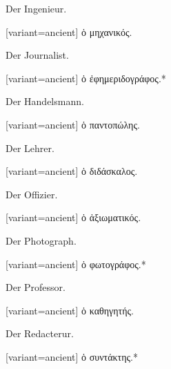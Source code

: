 Der Ingenieur.

\switchcolumn

\begin{greek}[variant=ancient]%
ὁ μηχανικός.

\end{greek}%
\switchcolumn*

Der Journalist.

\switchcolumn

\begin{greek}[variant=ancient]%
ὁ ἐφημεριδογράφος.{*}

\end{greek}%
\switchcolumn*

Der Handels\textcompwordmark{}mann. 

\switchcolumn

\begin{greek}[variant=ancient]%
ὁ παντοπώλης.

\end{greek}%
\switchcolumn*

Der Lehrer.

\switchcolumn

\begin{greek}[variant=ancient]%
ὁ διδάσκαλος.

\end{greek}%
\switchcolumn*

Der Offizier.

\switchcolumn

\begin{greek}[variant=ancient]%
ὁ ἀξιωματικός.

\end{greek}%
\switchcolumn*

Der Photograph.

\switchcolumn

\begin{greek}[variant=ancient]%
ὁ φωτογράφος.{*}

\end{greek}%
\switchcolumn*

Der Professor.

\switchcolumn

\begin{greek}[variant=ancient]%
ὁ καθηγητής.

\end{greek}%
\switchcolumn*

Der Redacterur.

\switchcolumn

\begin{greek}[variant=ancient]%
ὁ συντάκτης.{*}

\end{greek}%
\switchcolumn*

